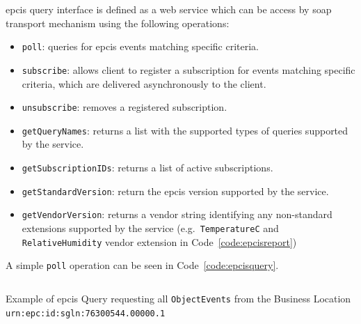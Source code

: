 \ac{epcis} query interface is defined as a web service which can be access by \ac{soap} transport mechanism using the following operations: 

\begin{itemize}
    \item \texttt{poll}: queries for \ac{epcis} events matching specific criteria.
    \item \texttt{subscribe}: allows client to register a subscription for events matching specific criteria, which are delivered asynchronously to the client. 
    \item \texttt{unsubscribe}: removes a registered subscription.
    \item \texttt{getQueryNames}: returns a list with the supported types of queries supported by the service.
    \item \texttt{getSubscriptionIDs}: returns a list of active subscriptions.
    \item \texttt{getStandardVersion}: return the \ac{epcis} version supported by the service.
    \item \texttt{getVendorVersion}: returns a vendor string identifying any non-standard extensions supported by the service (e.g.\ \texttt{TemperatureC} and \texttt{RelativeHumidity} vendor extension in Code~\ref{code:epcisreport})
\end{itemize}

A simple \texttt{poll} operation can be seen in Code~\ref{code:epcisquery}.

\begin{listing}
    \inputminted[linenos, breaklines]{xml}{./code/sota/EPCIS_query.xml}
    \caption{Example of \ac{epcis} Query requesting all \texttt{ObjectEvents} from the Business Location \texttt{urn:epc:id:sgln:76300544.00000.1}}
    \label{code:epcisquery}
\end{listing}

\cleardoublepage